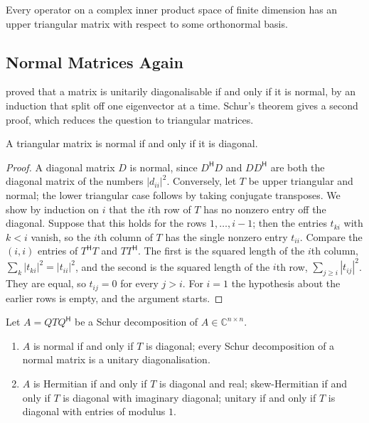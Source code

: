 \begin{corollary}
\label{cor:schur-operator}
Every operator on a complex inner product space of finite dimension has an upper triangular matrix with respect to some orthonormal basis.
\end{corollary}

\subsection{Normal Matrices Again}

 proved that a matrix is unitarily diagonalisable if and only if it is normal, by an induction that split off one eigenvector at a time. Schur's theorem gives a second proof, which reduces the question to triangular matrices.

\begin{lemma}
\label{lem:triangular-normal}
A triangular matrix is normal if and only if it is diagonal.
\end{lemma}

\begin{proof}
A diagonal matrix $D$ is normal, since $D^{\mathsf H}D$ and $DD^{\mathsf H}$ are both the diagonal matrix of the numbers $|d_{ii}|^2$. Conversely, let $T$ be upper triangular and normal; the lower triangular case follows by taking conjugate transposes. We show by induction on $i$ that the $i$th row of $T$ has no nonzero entry off the diagonal. Suppose that this holds for the rows $1,\ldots,i-1$; then the entries $t_{ki}$ with $k<i$ vanish, so the $i$th column of $T$ has the single nonzero entry $t_{ii}$. Compare the $(i,i)$ entries of $T^{\mathsf H}T$ and $TT^{\mathsf H}$. The first is the squared length of the $i$th column, $\sum_k|t_{ki}|^2=|t_{ii}|^2$, and the second is the squared length of the $i$th row, $\sum_{j\ge i}|t_{ij}|^2$. They are equal, so $t_{ij}=0$ for every $j>i$. For $i=1$ the hypothesis about the earlier rows is empty, and the argument starts.
\end{proof}

\begin{corollary}
\label{cor:schur-normal}
Let $A=QTQ^{\mathsf H}$ be a Schur decomposition of $A\in\mathbb C^{n\times n}$.
\begin{enumerate}
\item $A$ is normal if and only if $T$ is diagonal; every Schur decomposition of a normal matrix is a unitary diagonalisation.
\item $A$ is Hermitian if and only if $T$ is diagonal and real; skew-Hermitian if and only if $T$ is diagonal with imaginary diagonal; unitary if and only if $T$ is diagonal with entries of modulus $1$.
\end{enumerate}
\end{corollary}

